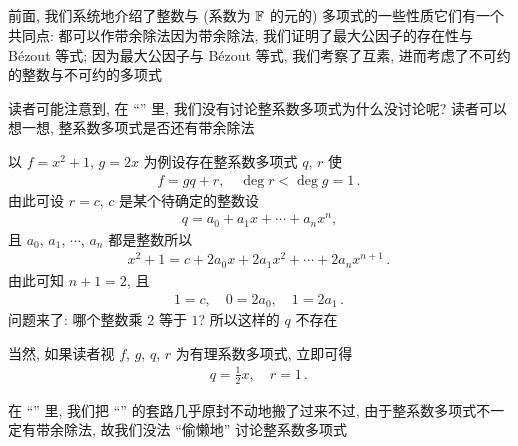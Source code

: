 \subsection*{\PolynomialsOverZAndOverQ}
\markright{\PolynomialsOverZAndOverQ}

前面, 我们系统地介绍了整数与 (系数为 $\mathbb{F}$ 的元的) 多项式的一些性质\period 它们有一个共同点: 都可以作带余除法\period 因为带余除法, 我们证明了最大公因子的存在性与 Bézout 等式; 因为最大公因子与 Bézout 等式, 我们考察了互素, 进而考虑了不可约的整数与不可约的多项式\period

读者可能注意到, 在 ``\SomePropertiesOfPolynomials '' 里, 我们没有讨论整系数多项式\period 为什么没讨论呢? 读者可以想一想, 整系数多项式是否还有带余除法\period

\begin{example}
    以 $f = x^2 + 1$, $g = 2x$ 为例\period 设存在整系数多项式 $q$, $r$ 使
    \begin{align*}
        f = gq + r, \quad \deg r < \deg g = 1 \period
    \end{align*}
    由此可设 $r = c$, $c$ 是某个待确定的整数\period 设
    \begin{align*}
        q = a_0 + a_1 x + \cdots + a_n x^n,
    \end{align*}
    且 $a_0$, $a_1$, $\cdots$, $a_n$ 都是整数\period 所以
    \begin{align*}
        x^2 + 1 = c + 2a_0 x + 2a_1 x^2 + \cdots + 2a_n x^{n+1} \period
    \end{align*}
    由此可知 $n+1 = 2$, 且
    \begin{align*}
        1 = c, \quad 0 = 2a_0, \quad 1 = 2a_1 \period
    \end{align*}
    问题来了: 哪个整数乘 $2$ 等于 $1$? 所以这样的 $q$ 不存在\period

    当然, 如果读者视 $f$, $g$, $q$, $r$ 为有理系数多项式, 立即可得
    \begin{align*}
        q = \frac{1}{2}x, \quad r = 1 \period
    \end{align*}
\end{example}

在 ``\SomePropertiesOfPolynomials '' 里, 我们把 ``\SomePropertiesOfIntegers '' 的套路几乎原封不动地搬了过来\period 不过, 由于整系数多项式不一定有带余除法, 故我们没法 ``偷懒地'' 讨论整系数多项式\period

